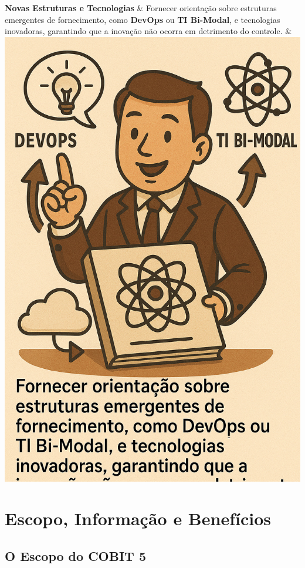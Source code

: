 \documentclass[
]{book}
\begin{document}
\begin{longtable}[]
\textbf{Novas Estruturas e Tecnologias} & Fornecer orientação sobre estruturas emergentes de fornecimento, como \textbf{DevOps} ou \textbf{TI Bi-Modal}, e tecnologias inovadoras, garantindo que a inovação não ocorra em detrimento do controle. & \includegraphics{images/07-2025-09-23_24/06-motivadores-informacoes_novas_tecnologias.jpg} \\
\end{longtable}

\section{Escopo, Informação e Benefícios}\label{escopo-informauxe7uxe3o-e-benefuxedcios}

\subsection{O Escopo do COBIT 5}\label{o-escopo-do-cobit-5}
\end{document}
